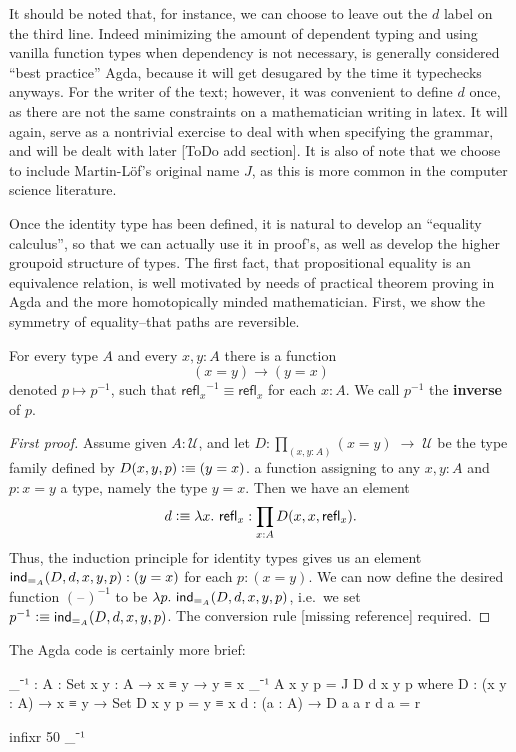\documentclass[11pt, a4paper]{article}
\newtheorem{proof}{Proof} \newtheorem{thm}{Theorem}
\newcommand{\jdeq}{\equiv} %
\newcommand{\refl}[1]{\ensuremath{\mathsf{refl}_{#1}}\xspace}
\newcommand{\define}[1]{\textbf{#1}} \newcommand{\defeq}{\vcentcolon\equiv} %
\newcommand{\blank}{\mathord{\hspace{1pt}\text{--}\hspace{1pt}}}
\newcommand{\opp}[1]{\mathord{{#1}^{-1}}} \let\rev\opp
\newcommand{\UU}{\ensuremath{\mathcal{U}}\xspace} \let\bbU\UU \let\type\UU
\begin{document}
It should be noted that, for instance, we can choose to leave out the $d$ label
on the third line. Indeed minimizing the amount of dependent typing and using
vanilla function types when dependency is not necessary, is generally considered
``best practice'' Agda, because it will get desugared by the time it typechecks
anyways. For the writer of the text; however, it was convenient to define $d$
once, as there are not the same constraints on a mathematician writing in latex.
It will again, serve as a nontrivial exercise to deal with when specifying the
grammar, and will be dealt with later [ToDo add section]. It is also of note
that we choose to include Martin-Löf's original name $J$, as this is more common
in the computer science literature.

Once the identity type has been defined, it is natural to develop an ``equality
calculus'', so that we can actually use it in proof's, as well as develop the
higher groupoid structure of types. The first fact, that propositional equality
is an equivalence relation, is well motivated by needs of practical theorem
proving in Agda and the more homotopically minded mathematician. First, we show
the symmetry of equality--that paths are reversible.

\begin{lem}\label{lem:opp} For every type $A$ and every $x,y:A$ there is a
function
  \begin{equation*} (x= y)\to(y= x)
  \end{equation*} denoted $p\mapsto \opp{p}$, such that
$\opp{\refl{x}}\jdeq\refl{x}$ for each $x:A$. We call $\opp{p}$ the
\define{inverse} of $p$. %
\end{lem}

\begin{proof}[First proof] Assume given $A:\UU$, and let
$D:{\textstyle\prod_{(x,y:A)}}(x= y) \; \to \; \type$ be the type family defined
by $D(x,y,p)\defeq (y= x)$. %
a function assigning to any $x,y:A$ and $p:x=y$ a type, namely the type $y=x$.
Then we have an element
  \begin{equation*} d\defeq \lambda x.\ \refl{x}:\prod_{x:A} D(x,x,\refl{x}).
  \end{equation*} Thus, the induction principle for identity types gives us an
element $\mathsf{ind}_{=_{A}}(D,d,x,y,p): (y= x)$ for each $p:(x= y)$. We can now define
the desired function $\opp{(\blank)}$ to be $\lambda p.\ \indid{A}(D,d,x,y,p)$,
i.e.\ we set $\opp{p} \defeq \indid{A}(D,d,x,y,p)$. The conversion rule [missing
reference] %
required.
\end{proof} The Agda code is certainly more brief:
\begin{code}

  _⁻¹ : {A : Set} {x y : A} → x ≡ y → y ≡ x _⁻¹ {A} {x} {y} p = J D d x y p
where D : (x y : A) → x ≡ y → Set D x y p = y ≡ x d : (a : A) → D a a r d a = r

  infixr 50 _⁻¹

\end{code}
\end{document}
